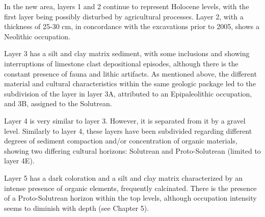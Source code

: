 \documentclass[12pt,twoside]{reedthesis}
\begin{document}
In the new area, layers 1 and 2 continue to represent Holocene levels, with the first layer being possibly disturbed by agricultural processes. Layer 2, with a thickness of 25-30 cm, in concordance with the excavations prior to 2005, shows a Neolithic occupation.

Layer 3 has a silt and clay matrix sediment, with some inclusions and showing interruptions of limestone clast depositional episodes, although there is the constant presence of fauna and lithic artifacts. As mentioned above, the different material and cultural characteristics within the same geologic package led to the subdivision of the layer in layer 3A, attributed to an Epipaleolithic occupation, and 3B, assigned to the Solutrean.

Layer 4 is very similar to layer 3. However, it is separated from it by a gravel level. Similarly to layer 4, these layers have been subdivided regarding different degrees of sediment compaction and/or concentration of organic materials, showing two differing cultural horizons: Solutrean and Proto-Solutrean (limited to layer 4E).

Layer 5 has a dark coloration and a silt and clay matrix characterized by an intense presence of organic elements, frequently calcinated. There is the presence of a Proto-Solutrean horizon within the top levels, although occupation intensity seems to diminish with depth (see Chapter 5).
\end{document}
